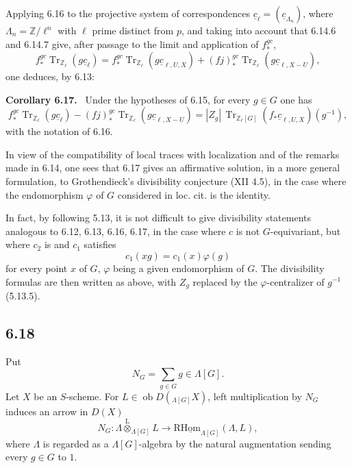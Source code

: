 \documentclass[11pt]{article}
\newenvironment{statement}[1]{\par\medskip\noindent\textbf{#1.}\ }{\par\medskip}
\providecommand{\Tr}{\operatorname{Tr}}
\providecommand{\Tr}{\operatorname{Tr}}
\providecommand{\lten}{\overset{\mathrm L}{\otimes}}
\providecommand{\Ob}{\operatorname{ob}}
\providecommand{\Tr}{\operatorname{Tr}}
\providecommand{\lten}{\overset{\mathrm L}{\otimes}}
\providecommand{\lten}{\overset{\mathrm L}{\otimes}}
\providecommand{\Ob}{\operatorname{ob}}
\providecommand{\Tr}{\operatorname{Tr}}
\providecommand{\lten}{\overset{\mathrm L}{\otimes}}
\providecommand{\lten}{\overset{\mathrm L}{\otimes}}
\providecommand{\Ob}{\operatorname{Ob}}
\providecommand{\lten}{\overset{\mathrm L}{\otimes}}
\providecommand{\Tr}{\operatorname{Tr}}
\providecommand{\Ob}{\operatorname{ob}}
\providecommand{\Ob}{\operatorname{Ob}}
\providecommand{\lten}{\overset{\mathrm L}{\otimes}}
\begin{document}
Applying 6.16 to the projective system of correspondences $\underline c_{\ell}=(\underline c_{\Lambda_n})$, where $\Lambda_n=\mathbb Z/\ell^n$ with $\ell$ prime distinct from $p$, and taking into account that 6.14.6 and 6.14.7 give, after passage to the limit and application of $f_*^{gc}$,
\[
f_*^{gc}\Tr_{\mathbb Z_{\ell}}(g\underline c_{\ell})
=
f_*^{gc}\Tr_{\mathbb Z_{\ell}}(g\underline c_{\ell,U,X})
+(fj)_*^{gc}\Tr_{\mathbb Z_{\ell}}(g\underline c_{\ell,X-U}),
\]
one deduces, by 6.13:

\begin{statement}{Corollary 6.17}
Under the hypotheses of 6.15, for every $g\in G$ one has
\begin{equation}
f_*^{gc}\Tr_{\mathbb Z_{\ell}}(g\underline c_{\ell})
-(fj)_*^{gc}\Tr_{\mathbb Z_{\ell}}(g\underline c_{\ell,X-U})
=
|Z_g|\,\Tr_{\mathbb Z_{\ell}[G]}(f_*\underline c_{\ell,U,X})(g^{-1}),
\tag{6.17.1}
\end{equation}
with the notation of 6.16.
\end{statement}

In view of the compatibility of local traces with localization and of the remarks made in 6.14, one sees that 6.17 gives an affirmative solution, in a more general formulation, to Grothendieck's divisibility conjecture (XII 4.5), in the case where the endomorphism $\varphi$ of $G$ considered in loc. cit. is the identity.

In fact, by following 5.13, it is not difficult to give divisibility statements analogous to 6.12, 6.13, 6.16, 6.17, in the case where $c$ is not $G$-equivariant, but where $c_2$ is and $c_1$ satisfies
\[
c_1(xg)=c_1(x)\varphi(g)
\]
for every point $x$ of $G$, $\varphi$ being a given endomorphism of $G$. The divisibility formulas are then written as above, with $Z_g$ replaced by the $\varphi$-centralizer of $g^{-1}$ (5.13.5).

\subsection*{6.18}
Put
\begin{equation}
N_G=\sum_{g\in G} g\in\Lambda[G].
\tag{6.18.1}
\end{equation}
Let $X$ be an $S$-scheme. For $L\in\Ob D({}_{\Lambda[G]}X)$, left multiplication by $N_G$ induces an arrow in $D(X)$
\begin{equation}
N_G:\Lambda\lten_{\Lambda[G]}L
\longrightarrow
\mathrm{R}\underline{\mathrm{Hom}}_{\Lambda[G]}(\Lambda,L),
\tag{6.18.2}
\end{equation}
where $\Lambda$ is regarded as a $\Lambda[G]$-algebra by the natural augmentation sending every $g\in G$ to $1$.
\end{document}
